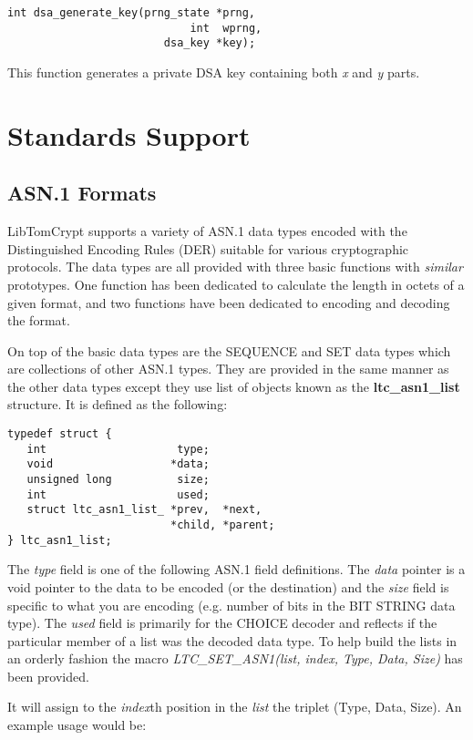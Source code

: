 \documentclass[synpaper]{book}
\newcommand{\mysection}[1]    %
	{                   %
	\section{#1}
   \markboth{\textsf{www.libtom.net}}{\thesection ~ {#1}}
	}
\begin{document}
\begin{verbatim}
int dsa_generate_key(prng_state *prng,
                            int  wprng,
                        dsa_key *key);
\end{verbatim}

This function generates a private DSA key containing both \textit{x} and \textit{y} parts.

\chapter{Standards Support}
\mysection{ASN.1 Formats}
LibTomCrypt supports a variety of ASN.1 data types encoded with the Distinguished Encoding Rules (DER) suitable for various cryptographic protocols.  The data types
are all provided with three basic functions with \textit{similar} prototypes.  One function has been dedicated to calculate the length in octets of a given
format, and two functions have been dedicated to encoding and decoding the format.

On top of the basic data types are the SEQUENCE and SET data types which are collections of other ASN.1 types.  They are provided
in the same manner as the other data types except they use list of objects known as the \textbf{ltc\_asn1\_list} structure.  It is defined as the following:

\begin{verbatim}
typedef struct {
   int                    type;
   void                  *data;
   unsigned long          size;
   int                    used;
   struct ltc_asn1_list_ *prev,  *next,
                         *child, *parent;
} ltc_asn1_list;
\end{verbatim}

The \textit{type} field is one of the following ASN.1 field definitions.  The \textit{data} pointer is a void pointer to the data to be encoded (or the destination) and the
\textit{size} field is specific to what you are encoding (e.g. number of bits in the BIT STRING data type).  The \textit{used} field is primarily for the CHOICE decoder
and reflects if the particular member of a list was the decoded data type.  To help build the lists in an orderly fashion the macro
\textit{LTC\_SET\_ASN1(list, index, Type, Data, Size)} has been provided.

It will assign to the \textit{index}th position in the \textit{list} the triplet (Type, Data, Size).  An example usage would be:
\end{document}
